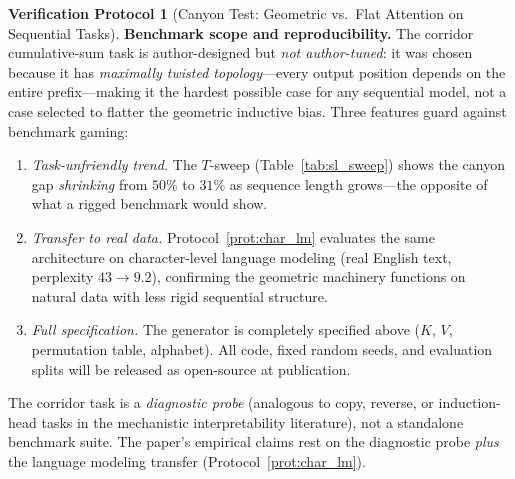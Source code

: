\documentclass[11pt,a4paper]{article}
\theoremstyle{definition}
\newtheorem{protocol}[theorem]{Verification Protocol}
\theoremstyle{remark}
\begin{document}
\begin{protocol}[Canyon Test: Geometric vs.\ Flat Attention on 
Sequential Tasks]
\medskip
\noindent\textbf{Benchmark scope and reproducibility.}
The corridor cumulative-sum task is author-designed but 
\emph{not author-tuned}: it was chosen because it has 
\emph{maximally twisted topology}---every output position depends 
on the entire prefix---making it the hardest possible case for 
any sequential model, not a case selected to flatter the 
geometric inductive bias.  Three features guard against 
benchmark gaming:
\begin{enumerate}[nosep]
  \item \emph{Task-unfriendly trend.} The $T$-sweep 
  (Table~\ref{tab:sl_sweep}) shows the canyon gap 
  \emph{shrinking} from $50\%$ to $31\%$ as sequence length 
  grows---the opposite of what a rigged benchmark would show.
  \item \emph{Transfer to real data.} 
  Protocol~\ref{prot:char_lm} evaluates the same architecture 
  on character-level language modeling (real English text, 
  perplexity $43 \to 9.2$), confirming the geometric machinery 
  functions on natural data with less rigid sequential structure.
  \item \emph{Full specification.} The generator is completely 
  specified above ($K$, $V$, permutation table, alphabet). 
  All code, fixed random seeds, and evaluation splits will be 
  released as open-source at publication.
\end{enumerate}
The corridor task is a \emph{diagnostic probe} (analogous to 
copy, reverse, or induction-head tasks in the mechanistic 
interpretability literature), not a standalone benchmark suite.  
The paper's empirical claims rest on the diagnostic probe 
\emph{plus} the language modeling transfer 
(Protocol~\ref{prot:char_lm}).
\end{protocol}


\end{document}
